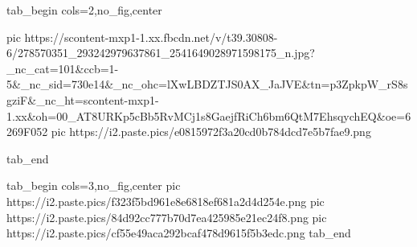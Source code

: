  
 
 
 
 


\ifcmt
  tab_begin cols=2,no_fig,center

     pic https://scontent-mxp1-1.xx.fbcdn.net/v/t39.30808-6/278570351_293242979637861_2541649028971598175_n.jpg?_nc_cat=101&ccb=1-5&_nc_sid=730e14&_nc_ohc=lXwLBDZTJS0AX_JaJVE&tn=p3ZpkpW_rS8sgziF&_nc_ht=scontent-mxp1-1.xx&oh=00_AT8URKp5cBb5RvMCj1s8GaejfRiCh6bm6QtM7EhsqychEQ&oe=6269F052
		 pic https://i2.paste.pics/e0815972f3a20cd0b784dcd7e5b7fae9.png

  tab_end
\fi

\ifcmt
  tab_begin cols=3,no_fig,center
		 pic https://i2.paste.pics/f323f5bd961e8e6818ef681a2d4d254e.png
		 pic https://i2.paste.pics/84d92cc777b70d7ea425985e21ec24f8.png
		 pic https://i2.paste.pics/cf55e49aca292bcaf478d9615f5b3edc.png
  tab_end
\fi
